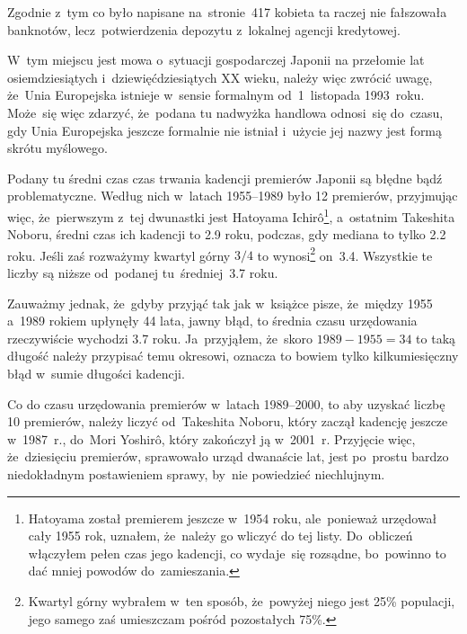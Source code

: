 \documentclass[a4paper,11pt]{article}
\begin{document}
\vspace{\spaceFour}



\start {} Zgodnie z~tym co było napisane na~stronie~417
kobieta ta raczej nie fałszowała banknotów, lecz~potwierdzenia
depozytu z~lokalnej agencji kredytowej.

\vspace{\spaceFour}



\start {} W~tym miejscu jest mowa o~sytuacji gospodarczej
Japonii na przełomie lat osiemdziesiątych i~dziewięćdziesiątych XX
wieku, należy więc zwrócić uwagę, że~Unia Europejska istnieje w~sensie
formalnym od~1~listopada 1993~roku. Może~się więc zdarzyć, że~podana
tu nadwyżka handlowa odnosi~się do~czasu, gdy Unia Europejska jeszcze
formalnie nie istniał i~użycie jej nazwy jest formą skrótu myślowego.

\vspace{\spaceFour}



\start {} Podany tu średni czas czas trwania kadencji premierów
Japonii są błędne bądź problematyczne. Według nich w~latach 1955--1989
było 12 premierów, przyjmując więc, że~pierwszym z~tej dwunastki jest
Hatoyama Ichir\^{o}\footnote{Hatoyama został premierem jeszcze w~1954
  roku, ale~ponieważ urzędował cały 1955 rok, uznałem, że~należy go
  wliczyć do tej listy. Do~obliczeń włączyłem pełen czas jego
  kadencji, co wydaje~się rozsądne, bo~powinno to dać mniej powodów
  do~zamieszania.}, a~ostatnim Takeshita Noboru, średni czas ich
kadencji to 2.9 roku, podczas, gdy mediana to tylko 2.2 roku. Jeśli
zaś rozważymy kwartyl górny $3 / 4$ to wynosi\footnote{Kwartyl górny
  wybrałem w~ten sposób, że~powyżej niego jest 25\% populacji, jego
  samego zaś umieszczam pośród pozostałych 75\%.} on~3.4. Wszystkie te
liczby są niższe od~podanej tu~średniej~3.7 roku.

Zauważmy jednak, że~gdyby przyjąć tak jak w~książce pisze, że~między
1955 a~1989 rokiem upłynęły 44 lata, jawny błąd, to średnia czasu
urzędowania rzeczywiście wychodzi 3.7 roku. Ja~przyjąłem, że~skoro
$1989 - 1955 = 34$ to taką długość należy przypisać temu okresowi,
oznacza to bowiem tylko kilkumiesięczny błąd w~sumie długości
kadencji.

Co do czasu urzędowania premierów w~latach 1989--2000, to aby uzyskać
liczbę 10 premierów, należy liczyć od~Takeshita Noboru, który zaczął
kadencję jeszcze w~1987~r., do~Mori Yoshir\^{o}, który zakończył ją
w~2001~r. Przyjęcie więc, że~dziesięciu premierów, sprawowało urząd
dwanaście lat, jest po~prostu bardzo niedokładnym postawieniem sprawy,
by~nie powiedzieć niechlujnym.
\end{document}
